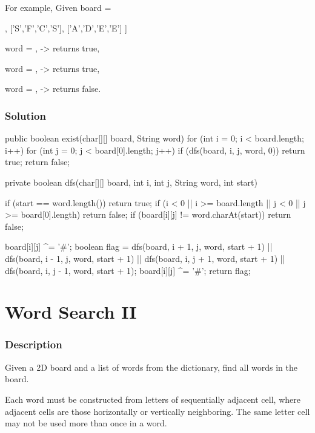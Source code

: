 For example,
Given board =
\begin{Code}
[
  ['A','B','C','E'],
  ['S','F','C','S'],
  ['A','D','E','E']
]
\end{Code}

word = , -> returns true,

word = , -> returns true,

word = , -> returns false.

\subsubsection{Solution}

\begin{Code}
public boolean exist(char[][] board, String word) {
    for (int i = 0; i < board.length; i++) {
        for (int j = 0; j < board[0].length; j++) {
            if (dfs(board, i, j, word, 0)) {
                return true;
            }
        }
    }
    return false;
}

private boolean dfs(char[][] board, int i, int j, String word, int start) {
    if (start == word.length()) {
        return true;
    }
    if (i < 0 || i >= board.length || j < 0 || j >= board[0].length) {
        return false;
    }
    if (board[i][j] != word.charAt(start)) {
        return false;
    }

    board[i][j] ^= '#';
    boolean flag = dfs(board, i + 1, j, word, start + 1)
            || dfs(board, i - 1, j, word, start + 1)
            || dfs(board, i, j + 1, word, start + 1)
            || dfs(board, i, j - 1, word, start + 1);
    board[i][j] ^= '#';
    return flag;
}
\end{Code}

\newpage

\section{Word Search II} %

\subsubsection{Description}
Given a 2D board and a list of words from the dictionary, find all words in the board.

Each word must be constructed from letters of sequentially adjacent cell, where adjacent cells are those horizontally or vertically neighboring. The same letter cell may not be used more than once in a word.

